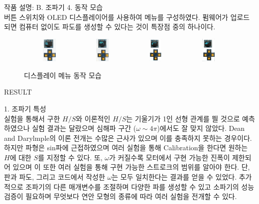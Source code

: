 \documentclass[a0paper,portrait]{Junlam_PosterP}
\begin{document}
\begin{poster}
\begin{posterbox}[name=circuit,column=1,below=wtank, above=bottom]{작품 설명: B. 조파기}
\small {4. 동작 모습}\\
    \scriptsize {버튼 스위치와 OLED 디스플레이어를 사용하여 메뉴를 구성하였다. 펌웨어가 업로드 되면 컴퓨터 없이도 파도를 생성할 수 있다는 것이 특장점 중의 하나이다. }
    \begin{figure}[H]
            \includegraphics[trim=30 1050 100 0, clip, width=0.24\textwidth, height=1.2cm]{images/OLED1.png} 
            \includegraphics[trim=100 1550 100 0, clip, width=0.24\textwidth, height=1.2cm]{images/OLED2.png}
            \includegraphics[trim=30 950 150 0,clip, width=0.24\textwidth, height=1.2cm]{images/OLED3.png}
            \includegraphics[trim=30 950 100 0, clip, width=0.24\textwidth, height=1.2cm]{images/OLED4.png}
        \caption{디스플레이 메뉴 동작 모습}
        \label{Oled}   
    \end{figure} 
    
\end{posterbox}

\begin{posterbox}[name=result,column=2,below=wtank]{RESULT}

\small {1. 조파기 특성\\}
    \scriptsize{
    실험을 통해서 구한 $H/S$와 이론적인 $H/S$는 기울기가 1인 선형 관계를 띌 것으로 예측하였으나 실험 결과는 달랐으며 심해파 구간 ($\omega\sim4\pi$)에서도 잘 맞지 않았다. Dean and Darylmple의 이론 전개는 수많은 근사가 있으며 이를 충족하지 못하는 경우이다. 하지만 파형은 sin파에 근접하였으며 여러 실험을 통해 Calibration을 한다면 원하는 $H$에 대한 $S$를 지정할 수 있다. 또, $\omega$가 커질수록 모터에서 구현 가능한 진폭이 제한되어 있으며 이 또한 여러 실험을 통해 구현 가능한 스트로크의 범위를 알아야 한다. 단, 판과 파도, 그리고 코드에서 작성한 $\omega$는 모두 일치한다는 결과를 얻을 수 있었다. 추가적으로 조파기의 다른 매개변수를 조절하며 다양한 파를 생성할 수 있고 소파기의 성능 검증이 필요하며 무엇보다 연안 모형의 종류에 따라 여러 실험을 전개할 수 있다.
    }
    

\end{posterbox}
\end{poster}
\end{document}
